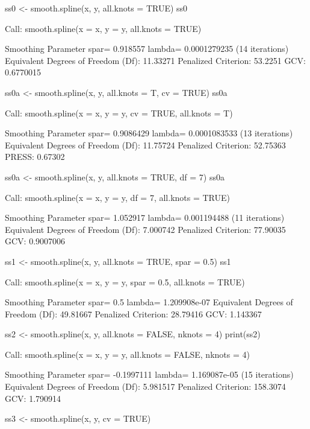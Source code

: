 \begin{Schunk}
\begin{Sinput}
 ss0 <- smooth.spline(x, y, all.knots = TRUE)
 ss0
\end{Sinput}
\begin{Soutput}
Call:
smooth.spline(x = x, y = y, all.knots = TRUE)

Smoothing Parameter  spar= 0.918557  lambda= 0.0001279235 (14 iterations) 
Equivalent Degrees of Freedom (Df): 11.33271 
Penalized Criterion: 53.2251 
GCV: 0.6770015 
\end{Soutput}
\begin{Sinput}
 ss0a <- smooth.spline(x, y, all.knots = T, cv = TRUE)
 ss0a
\end{Sinput}
\begin{Soutput}
Call:
smooth.spline(x = x, y = y, cv = TRUE, all.knots = T)

Smoothing Parameter  spar= 0.9086429  lambda= 0.0001083533 (13 iterations) 
Equivalent Degrees of Freedom (Df): 11.75724 
Penalized Criterion: 52.75363 
PRESS: 0.67302 
\end{Soutput}
\begin{Sinput}
 ss0a <- smooth.spline(x, y, all.knots = TRUE, df = 7)
 ss0a
\end{Sinput}
\begin{Soutput}
Call:
smooth.spline(x = x, y = y, df = 7, all.knots = TRUE)

Smoothing Parameter  spar= 1.052917  lambda= 0.001194488 (11 iterations) 
Equivalent Degrees of Freedom (Df): 7.000742 
Penalized Criterion: 77.90035 
GCV: 0.9007006 
\end{Soutput}
\begin{Sinput}
 ss1 <- smooth.spline(x, y, all.knots = TRUE, spar = 0.5)
 ss1
\end{Sinput}
\begin{Soutput}
Call:
smooth.spline(x = x, y = y, spar = 0.5, all.knots = TRUE)

Smoothing Parameter  spar= 0.5  lambda= 1.209908e-07 
Equivalent Degrees of Freedom (Df): 49.81667 
Penalized Criterion: 28.79416 
GCV: 1.143367 
\end{Soutput}
\begin{Sinput}
 ss2 <- smooth.spline(x, y, all.knots = FALSE, nknots = 4)
 print(ss2)
\end{Sinput}
\begin{Soutput}
Call:
smooth.spline(x = x, y = y, all.knots = FALSE, nknots = 4)

Smoothing Parameter  spar= -0.1997111  lambda= 1.169087e-05 (15 iterations) 
Equivalent Degrees of Freedom (Df): 5.981517 
Penalized Criterion: 158.3074 
GCV: 1.790914 
\end{Soutput}
\begin{Sinput}
 ss3 <- smooth.spline(x, y, cv = TRUE)
\end{Sinput}
\end{Schunk}
